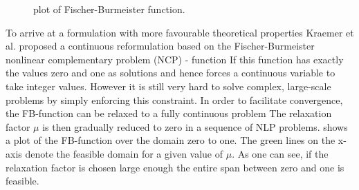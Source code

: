     \begin{figure}
        \scriptsize
        \center
        
        \caption{plot of Fischer-Burmeister function.}
        \label{fig:FB_plot}
    \end{figure}

    To arrive at a formulation with more favourable theoretical properties Kraemer et al. \cite{Kraemer.2009} proposed
    a continuous reformulation based on the Fischer-Burmeister nonlinear complementary problem (NCP) - function
    If this function has exactly the values zero and one as solutions and hence forces a continuous variable to
    take integer values. However it is still very hard to solve complex, large-scale problems by simply enforcing this
    constraint. In order to facilitate convergence, the FB-function can be relaxed to a fully continuous problem
    The relaxation factor $\mu$ is then gradually reduced to zero in a sequence of NLP problems. 
    shows a plot of the FB-function over the domain zero to one. The green lines on the x-axis denote the feasible domain 
    for a given value of $\mu$. As one can see, if the relaxation factor is chosen large enough the entire span 
    between zero and one is feasible. 

